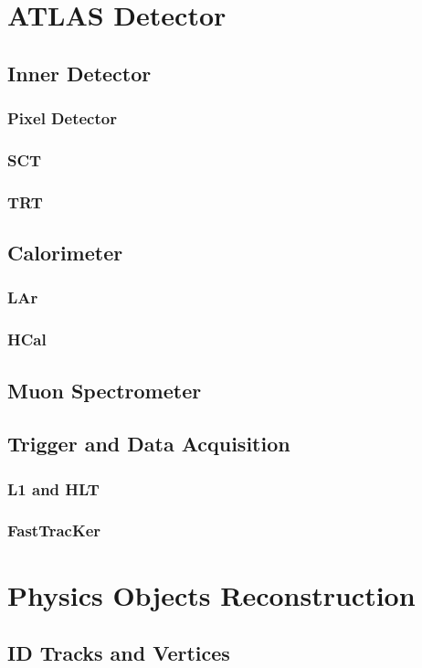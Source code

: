 \chapter{ATLAS Detector}
\section{Inner Detector}
\subsection{Pixel Detector}
\subsection{SCT}
\subsection{TRT}
\section{Calorimeter}
\subsection{LAr}
\subsection{HCal}
\section{Muon Spectrometer}

\section{Trigger and Data Acquisition}
\subsection{L1 and HLT}
\subsection{FastTracKer}

\chapter{Physics Objects Reconstruction}
\section{ID Tracks and Vertices}

